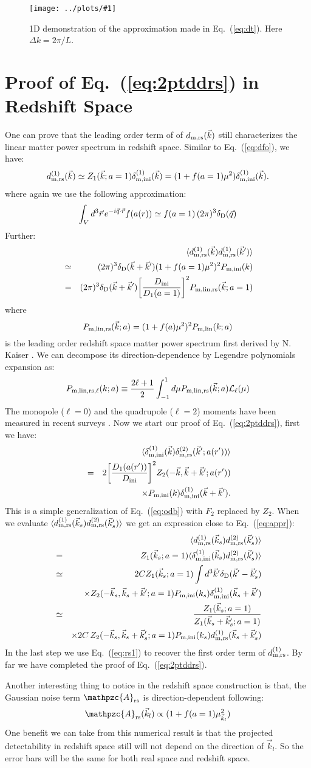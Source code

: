 \documentclass[prd,amsmath,amssymb,floatfix,superscriptaddress,nofootinbib,twocolumn]{revtex4-1}
\def\be{\begin{equation}}
\def\ee{\end{equation}}
\def\bea{\begin{eqnarray}}
\def\eea{\end{eqnarray}}
\newcommand{\rs}{\rm rs}
\newcommand{\ini}{\rm ini}
\newcommand{\vrr}{\vec{r}}
\newcommand{\vs}{\nonumber\\}
\newcommand{\vk}{\vec{k}}
\newcommand{\ec}[1]{Eq.~(\ref{eq:#1})}
\newcommand{\eql}[1]{\label{eq:#1}}
\newcommand{\sfig}[2]{
\texttt{[image: ../plots/\#1]}
        }
\newcommand{\Sfig}[2]{
   \begin{figure}[thbp]
   \begin{center}
    \sfig{../plots/#1.pdf}{\columnwidth}
    \caption{{\small #2}}
    \label{fig:#1}
     \end{center}
   \end{figure}
}
\begin{document}
\Sfig{approx}{1D demonstration of the approximation made in \ec{dt}. Here $\Delta k=2\pi /L$.}

\section{Proof of \ec{2ptddrs} in Redshift Space} \label{appendb}
One can prove that the leading order term of of $d_{\rm m,rs}(\vk)$ still characterizes the linear matter power spectrum in redshift space. Similar to \ec{dfo}, we have:
\be
d^{( 1)}_{\rm m,rs}(\vk)\simeq Z_{1}(\vk;a=1)\dmi^{(1)}(\vk)=(1+f(a=1)\mu^2)\dmi^{(1)}(\vk).\eql{rs1}
\ee
where again we use the following approximation:
\be 
\int_{V} d^{3}\vrr\, e^{-i\vec{q}\cdot\vrr}f(a(r))  \simeq f(a=1)\,(2\pi)^3\delta_{\rm D}(\vec{q})
\ee 
Further:
\bea 
&&\langle d^{( 1)}_{\rm m,rs}(\vk) d^{(1)}_{\rm m,rs}(\vk') \rangle\vs
& \simeq&(2\pi)^3 \delta_{\rm D}(\vk+\vk')(1+f(a=1)\mu^2)^2 P_{\rm m,ini}(k)\vs
&= &(2\pi)^3 \delta_{\rm D}(\vk+\vk')\bigg[ \frac{D_{\ini}}{D_1(a=1)}\bigg]^2 P_{\rm m,lin,rs}(\vk;a=1)\vs \eql{lpsrs}
\eea 
where 
\be 
P_{\rm m,lin,rs}(\vk;a)=(1+f(a)\mu^2)^2 P_{\rm m,lin}(k;a) \eql{kaiser}
\ee 
is the leading order redshift space matter power spectrum first derived by N. Kaiser \cite{Kaiser:1987rsd}. We can decompose its direction-dependence by Legendre polynomials expansion as:
\be 
P_{\rm m,lin,rs,\ell}(k;a)\equiv \frac{2\ell+1}{2}\int_{-1}^{1}d\mu P_{\rm m,lin,rs}(\vk;a) \mathcal{L}_{\ell}(\mu)
\ee 
The monopole ($\ell=0$) and the quadrupole ($\ell=2$) moments have been measured in recent surveys \cite{Gil-Marin:2015sqa}. Now we start our proof of \ec{2ptddrs}, first we have:
\bea 
&&\langle \dmi^{(1)}(\vk)\delta_{\rm m,\rs}^{(2)}(\vk';a(r'))\rangle\vs 
&=&2\bigg[\frac{D_{1}(a(r'))}{D_{\ini}} \bigg]^{2}Z_{2}(-\vk,\vk+\vk';a(r')) \vs
& &\times P_{\rm m,\ini}(k)\dmi^{(1)}(\vk+\vk').\vs
\eea 
This is a simple generalization of \ec{odb} with $F_2$ replaced by $Z_2$. When we evaluate $\langle d_{\rm m,\rs}^{(1)}(\vk_s) d_{\rm m,\rs}^{(2)}(\vk'_s)\rangle$ we get an expression close to \ec{appr}:
\bea 
&& \langle d^{(1)}_{\rm m,\rs}(\vk_s)d^{(2)}_{\rm m,\rs}(\vk_s') \rangle \vs 
&=&  Z_{1}(\vk_s;a=1)\langle \dmi^{(1)}(\vk_s)d^{(2)}_{\rm m,\rs}(\vk_s') \rangle\vs
&\simeq &2CZ_{1}(\vk_s;a=1)\int {d^{3}\vk'}\delta_{\rm D}(\vk'-\vk_s') \vs
&&\times Z_{2}(-\vk_s,\vk_s+\vk';a=1)P_{\rm m,\ini}(k_s)\dmi^{(1)}(\vk_s+\vk') \vs
&\simeq & \frac{Z_{1}(\vk_s;a=1 )}{Z_{1}(\vk_s+\vk_s';a=1)} \vs 
&&\times2C\,Z_{2}(-\vk_s,\vk_s+\vk_s';a=1) P_{\rm m,\ini}(k_s)d_{\rm m,rs}^{(1)}(\vk_s+\vk_s') \vs\eql{apprrs}
\eea 
In the last step we use \ec{rs1} to recover the first order term of $d_{\rm m,rs}^{(1)}$. By far we have completed the proof of \ec{2ptddrs}.

Another interesting thing to notice in the redshift space construction is that, the Gaussian noise term $\mathpzc{A}_{\rs}$ is direction-dependent following:
\be 
\mathpzc{A}_{\rs}(\vk_l)\propto(1+f(a=1)\mu_{\vk_l}^{2})
\ee 
One benefit we can take from this numerical result is that the projected detectability in redshift space still will not depend on the direction of $\vk_l$. So the error bars will be the same for both real space and redshift space.




\end{document}
